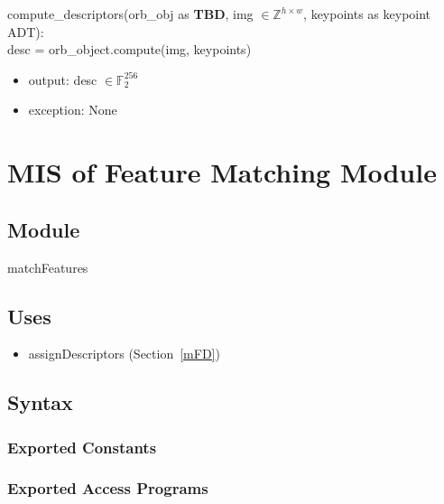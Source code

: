 \documentclass[12pt, titlepage]{article}
\begin{document}
\noindent compute\_descriptors(orb\_obj as \textbf{TBD}, img $\in 
\mathbb{Z}^{h \times w}$, keypoints as keypoint ADT):\\
desc = orb\_object.compute(img, keypoints)
\begin{itemize}
\item output: desc $\in \mathbb{F}_{2}^{256}$
\item exception: None 
\end{itemize}




\section{MIS of Feature Matching Module} \label{mFM}



\subsection{Module}

matchFeatures

\subsection{Uses}
\begin{itemize}
  \item assignDescriptors (Section~\ref{mFD})
\end{itemize}

\subsection{Syntax}

\subsubsection{Exported Constants}

\subsubsection{Exported Access Programs}
\end{document}

